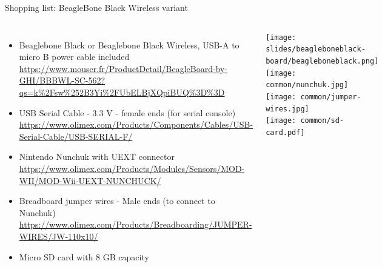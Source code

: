 \begin{frame}[fragile]{Shopping list: BeagleBone Black Wireless variant}
  \begin{columns}
    \begin{itemize}
    \item Beaglebone Black or Beaglebone Black Wireless, USB-A to
      micro B power cable included
      {\fontsize{6}{6}\selectfont
        \url{https://www.mouser.fr/ProductDetail/BeagleBoard-by-GHI/BBBWL-SC-562?qs=k%2Fsw%252B3Yi%2FUbELBjXQpiBUQ%3D%3D}
      }
    \item USB Serial Cable - 3.3 V - female ends (for serial console)
      {\fontsize{6}{6}\selectfont
        \url{https://www.olimex.com/Products/Components/Cables/USB-Serial-Cable/USB-SERIAL-F/}
      }
    \item Nintendo Nunchuk with UEXT connector
      {\fontsize{6}{6}\selectfont
        \url{https://www.olimex.com/Products/Modules/Sensors/MOD-WII/MOD-Wii-UEXT-NUNCHUCK/}
      }
    \item Breadboard jumper wires - Male ends (to connect to Nunchuk)
      {\fontsize{6}{6}\selectfont
        \url{https://www.olimex.com/Products/Breadboarding/JUMPER-WIRES/JW-110x10/}
      }
    \item Micro SD card with 8 GB capacity
    \end{itemize}
    \begin{center}
      \texttt{[image: slides/beagleboneblack-board/beagleboneblack.png]} \\
      \texttt{[image: common/nunchuk.jpg]} \\
      \texttt{[image: common/jumper-wires.jpg]} \\
      \texttt{[image: common/sd-card.pdf]}
    \end{center}
  \end{columns}
\end{frame}

